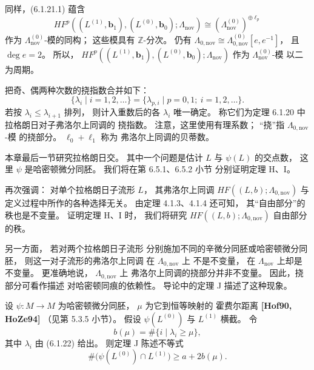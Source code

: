 同样，(6.1.21.1) 蕴含
\begin{equation}
HF^p((L^{(1)},\mathbf b_1),
(L^{(0)},\mathbf b_0);
\Lambda_{\mathrm{nov}})
\cong
(\Lambda_{\mathrm{nov}}^{(0)})^{\oplus\ell_p}
\tag{6.1.21.2}\label{eq:6-1-21-2}
\end{equation}
作为 $\Lambda_{\mathrm{nov}}^{(0)}$-模的同构；
这些模具有 $\mathbb Z$-分次。
仍有
$\Lambda_{0,\mathrm{nov}}
\cong\Lambda_{0,\mathrm{nov}}^{(0)}[e,e^{-1}]$，
且 $\deg e=2$。
所以，
$HF^p((L^{(1)},\mathbf b_1),
(L^{(0)},\mathbf b_0);
\Lambda_{\mathrm{nov}})$
作为 $\Lambda_{\mathrm{nov}}^{(0)}$-模
以二为周期。

把奇、偶两种次数的挠指数合并如下：
\begin{equation}
\{\lambda_i\mid i=1,2,\ldots\}
=
\{\lambda_{p,i}\mid
p=0,1;\ i=1,2,\ldots\}.
\tag{6.1.22}\label{eq:6-1-22}
\end{equation}
若按 $\lambda_i\le\lambda_{i+1}$ 排列，
则计入重数后的各 $\lambda_i$
唯一确定。
称它们为定理 6.1.20 中
拉格朗日对子弗洛尔上同调的
挠指数。
注意，这里使用有理系数；
“挠”指 $\Lambda_{0,\mathrm{nov}}$-模
的挠部分。
$\ell_0+\ell_1$ 称为
弗洛尔上同调的贝蒂数。

本章最后一节研究拉格朗日交。
其中一个问题是估计
$L$ 与 $\psi(L)$ 的交点数，
这里 $\psi$ 是哈密顿微分同胚。
我们将在第 6.5.1、6.5.2 小节
分别证明定理 H、I。

再次强调：
对单个拉格朗日子流形 $L$，
其弗洛尔上同调
$HF((L,b);\Lambda_{0,\mathrm{nov}})$
与定义过程中所作的各种选择无关。
由定理 4.1.3、4.1.4 还可知，
其“自由部分”的秩也是不变量。
证明定理 H、I 时，
我们将研究
$HF((L,b);\Lambda_{0,\mathrm{nov}})$
自由部分的秩。

另一方面，
若对两个拉格朗日子流形
分别施加不同的辛微分同胚或哈密顿微分同胚，
则这一对子流形的弗洛尔上同调
在 $\Lambda_{0,\mathrm{nov}}$ 上
不是不变量，
在 $\Lambda_{\mathrm{nov}}$ 上却是不变量。
更准确地说，
$\Lambda_{0,\mathrm{nov}}$ 上
弗洛尔上同调的挠部分并非不变量。
因此，挠部分可看作描述
对哈密顿同痕的依赖性。
导论中的定理 J
描述了这种现象。

设 $\psi:M\to M$
为哈密顿微分同胚，
$\mu$ 为它到恒等映射的
霍费尔距离
\textbf{[Hof90, HoZe94]}
（见第 5.3.5 小节）。
假设 $\psi(L^{(0)})$
与 $L^{(1)}$ 横截。
令
\[
b(\mu)=\#\{i\mid\lambda_i\ge\mu\},
\]
其中 $\lambda_i$ 由 (6.1.22) 给出。
则定理 J 陈述不等式
\begin{equation}
\#\bigl(\psi(L^{(0)})\cap L^{(1)}\bigr)
\ge a+2b(\mu).
\tag{6.1.23}\label{eq:6-1-23}
\end{equation}

